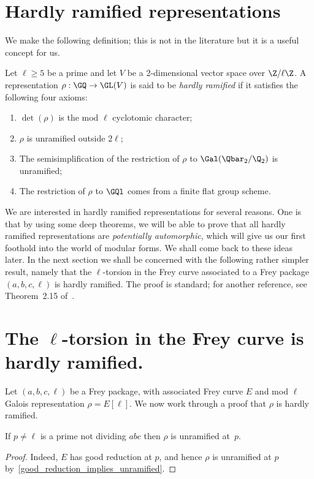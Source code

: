 \section{Hardly ramified representations}

We make the following definition; this is not in the literature but it is a useful concept for us.

\begin{definition}\label{hardly_ramified}\notready Let $\ell\geq5$ be a prime and let $V$ be a
  2-dimensional vector space over $\Z/\ell\Z$. A representation
  $\rho: \GQ\to \GL(V)$ is said to be \emph{hardly ramified} if it satisfies the following four axioms:
  \begin{enumerate}
  \item $\det(\rho)$ is the mod $\ell$ cyclotomic character;
  \item $\rho$ is unramified outside $2\ell$;
  \item The semisimplification of the restriction of $\rho$ to $\Gal(\Qbar_2/\Q_2)$ is unramified;
  \item The restriction of $\rho$ to $\GQl$ comes from a finite flat group scheme.
  \end{enumerate}
\end{definition}

We are interested in hardly ramified representations for several reasons. One is that by using some
deep theorems, we will be able to prove that all hardly ramified representations are
\emph{potentially automorphic}, which will give us our first foothold into the world of modular
forms. We shall come back to these ideas later. In the next section we shall be concerned with
the following rather simpler result, namely that the $\ell$-torsion in the Frey curve
associated to a Frey package $(a,b,c,\ell)$ is hardly ramified. The proof is standard;
for another reference, see Theorem~2.15 of~\cite{ddt}.

\section[The l-torsion in the Frey curve is hardly ramified.]{The $\ell$-torsion in the Frey curve is hardly ramified.}

Let $(a,b,c,\ell)$ be a Frey package, with associated Frey curve $E$ and mod $\ell$ Galois
 representation $\rho=E[\ell]$. We now work through a proof that $\rho$ is hardly ramified.

 \begin{theorem}\label{Frey_curve_good}\notready If $p\not=\ell$ is a prime not dividing $abc$ then
  $\rho$ is unramified at~$p$.
 \end{theorem}
 \begin{proof} Indeed, $E$ has good reduction at $p$, and hence $\rho$ is unramified at $p$
  by~\ref{good_reduction_implies_unramified}.
 \end{proof}

